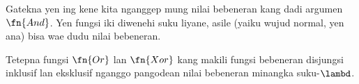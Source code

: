 \documentclass[../../../include/open-logic-section]{subfiles}
\begin{document}
Gatekna yen ing kene
kita nganggep mung
nilai bebeneran kang
dadi argumen
$\fn{And}$.
Yen fungsi iki
diwenehi suku liyane,
asile (yaiku wujud
normal, yen ana)
bisa wae dudu
nilai bebeneran.

\begin{prob}
  Tetepna fungsi
  $\fn{Or}$ lan
  $\fn{Xor}$ kang
  makili fungsi
  bebeneran disjungsi
  inklusif lan
  eksklusif nganggo
  pangodean nilai
  bebeneran minangka
  suku-$\lambd$.
\end{prob}
\end{document}

